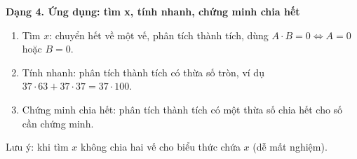 \textbf{Dạng 4. Ứng dụng: tìm x, tính nhanh, chứng minh chia hết}
\begin{enumerate}
\item Tìm $x$: chuyển hết về một vế, phân tích thành tích, dùng $A\cdot B=0\iff A=0$ hoặc $B=0$.
\item Tính nhanh: phân tích thành tích có thừa số tròn, ví dụ $37\cdot 63+37\cdot 37=37\cdot 100$.
\item Chứng minh chia hết: phân tích thành tích có một thừa số chia hết cho số cần chứng minh.
\end{enumerate}
Lưu ý: khi tìm $x$ không chia hai vế cho biểu thức chứa $x$ (dễ mất nghiệm).
